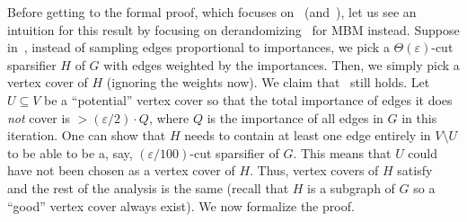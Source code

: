 \documentclass{article}
\newcommand{\eps}{\varepsilon}
\begin{document}
Before getting to the formal proof, which focuses on~ (and~), 
let us see an intuition for this result by focusing on derandomizing~ for MBM instead. Suppose in~, instead of sampling edges proportional to importances, 
we pick a $\Theta(\eps)$-cut sparsifier $H$  of $G$ with edges weighted by the importances. Then, we simply pick a vertex cover of $H$ (ignoring the weights now). We claim that~ 
still holds. Let $U \subseteq V$ be a ``potential'' vertex cover so that the total importance of edges it does \emph{not} cover is $> (\eps/2) \cdot Q$, 
where $Q$ is the  importance of all edges in $G$ in this iteration. One can show that $H$ needs to contain at least one edge entirely in $V \setminus U$ 
to be able to be a, say, $(\eps/100)$-cut sparsifier of $G$. 
This means
that $U$ could have not been chosen as a vertex cover of $H$. Thus, vertex covers of $H$ satisfy~ and the rest of the analysis is the same (recall that $H$ is a subgraph of $G$ so
a ``good'' vertex cover always exist). We now formalize the proof. 
\end{document}
